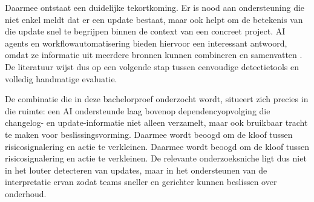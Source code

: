 Daarmee ontstaat een duidelijke tekortkoming. Er is nood aan ondersteuning die niet enkel meldt dat er een update bestaat, maar ook helpt om de betekenis van die update snel te begrijpen binnen de context van een concreet project. AI agents en workflowautomatisering bieden hiervoor een interessant antwoord, omdat ze informatie uit meerdere bronnen kunnen combineren en samenvatten \textcite{Joshi2025,Kim2024,Zhu2025,Wali2025}. De literatuur wijst dus op een volgende stap tussen eenvoudige detectietools en volledig handmatige evaluatie.

De combinatie die in deze bachelorproef onderzocht wordt, situeert zich precies in die ruimte: een AI ondersteunde laag bovenop dependencyopvolging die changelog- en update-informatie niet alleen verzamelt, maar ook bruikbaar tracht te maken voor beslissingsvorming. Daarmee wordt beoogd om de kloof tussen risicosignalering en actie te verkleinen. Daarmee wordt beoogd om de kloof tussen risicosignalering en actie te verkleinen. De relevante onderzoeksniche ligt dus niet in het louter detecteren van updates, maar in het ondersteunen van de interpretatie ervan zodat teams sneller en gerichter kunnen beslissen over onderhoud.